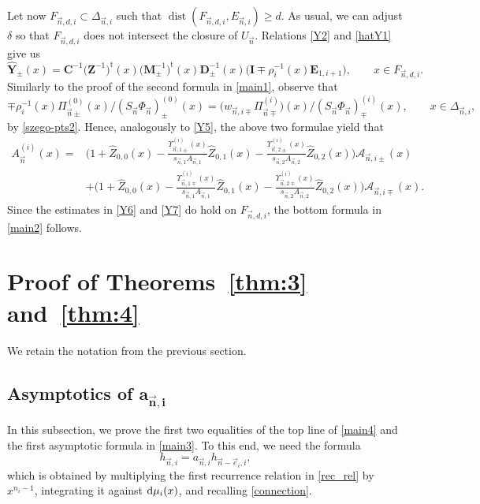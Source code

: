 \documentclass[10pt,a4paper]{amsart}
\numberwithin{equation}{section}
\newcommand{\dist}{\operatorname{dist}}
\newcommand{\n}{{\vec n}}
\begin{document}
Let now $ F_{\n,d,i} \subset \Delta_{\n,i} $ such that $ \dist(F_{\n,d,i}, E_{\n,i})\geq d $. As usual, we can adjust $ \delta $ so that $ F_{\n,d,i} $ does not intersect the closure of $ U_\n $. Relations \eqref{Y2} and \eqref{hatY1} give us
\[
\widehat{\boldsymbol Y}_{\pm}(x) = \boldsymbol C^{-1}\bigl(\boldsymbol Z^{-1}\bigr)^{\mathrm t}(x)\bigl(\boldsymbol M_{\pm}^{-1}\bigr)^\mathrm{t}(x)\boldsymbol D_{\pm}^{-1}(x)\bigl(\boldsymbol I\mp \rho_i^{-1}(x)\boldsymbol E_{1,i+1}\bigr), \qquad x\in F_{\n,d,i}.
\]
Similarly to the proof of the second formula in \eqref{main1}, observe that
\[
\mp\rho_i^{-1}(x)\Pi_{\n\pm}^{(0)}(x)/(S_\n\Phi_\n)_\pm^{(0)}(x) = \bigl(w_{\n,i\mp}\Pi_{\n\mp}^{(i)}\bigr)(x)/(S_\n\Phi_\n)_\mp^{(i)}(x), \qquad x\in\Delta_{\n,i},
\]
by \eqref{szego-pts2}. Hence, analogously to \eqref{Y5}, the above two formulae yield that
\begin{align*}
A_\n^{(i)}(x) ={}& \Bigg(1 + \widehat Z_{0,0}(x) - \frac{\Upsilon_{\n,1\pm}^{(i)}(x)}{s_{\n,1}A_{\n,1}} \widehat Z_{0,1}(x) - \frac{\Upsilon_{\n,2\pm}^{(i)}(x)}{s_{\n,2}A_{\n,2}}\widehat Z_{0,2}(x) \Bigg) \mathcal A_{\n,i\pm}(x) \\
& + \Bigg(1 + \widehat Z_{0,0}(x) - \frac{\Upsilon_{\n,1\mp}^{(i)}(x)}{s_{\n,1}A_{\n,1}} \widehat Z_{0,1}(x) - \frac{\Upsilon_{\n,2\mp}^{(i)}(x)}{s_{\n,2}A_{\n,2}} \widehat Z_{0,2}(x) \Bigg) \mathcal A_{\n,i\mp}(x).
\end{align*}
Since the estimates in \eqref{Y6} and \eqref{Y7} do hold on $ F_{\n,d,i} $, the bottom formula in \eqref{main2} follows.


\section[Proof of Theorems 1.10 and 1.11]{Proof of Theorems~\ref{thm:3} and~\ref{thm:4}}


We retain the notation from the previous section.

\subsection[Asymptotics of a\_n,i]{Asymptotics of $\boldsymbol{a_{\n,i} }$}

In this subsection, we prove the first two equalities of the top line of \eqref{main4} and the first asymptotic formula in \eqref{main3}. To this end, we need the formula
\begin{equation}
\label{9.1.1}
h_{\n,i} = a_{\n,i} h_{\n-\vec e_i,i},
\end{equation}
which is obtained by multiplying the first recurrence relation in \eqref{rec_rel} by $ x^{n_i-1} $, integrating it against $ {\rm d}\mu_i(x) $, and recalling \eqref{connection}.
\end{document}
